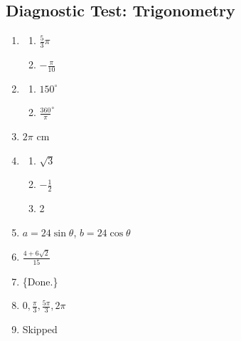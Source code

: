 \documentclass{article}
\begin{document}
\subsection{Diagnostic Test: Trigonometry}
\begin{enumerate}
    \item \begin{enumerate}[label=(\alph*)]
              \item $\frac{5}{3}\pi$
              \item $-\frac{\pi}{10}$
          \end{enumerate}
    \item \begin{enumerate}[label=(\alph*)]
              \item $150^\circ$
              \item $\frac{360}{\pi}^\circ$
          \end{enumerate}
    \item $2\pi$ cm
    \item \begin{enumerate}[label=(\alph*)]
              \item $\sqrt{3}$
              \item $-\frac{1}{2}$
              \item 2
          \end{enumerate}
    \item $a = 24\sin{\theta}$, $b = 24\cos{\theta}$
    \item $\frac{4+6\sqrt{2}}{15}$
    \item \{Done.\}
    \item $0, \frac{\pi}{3}, \frac{5\pi}{3}, 2\pi$
    \item Skipped
\end{enumerate}
\end{document}
